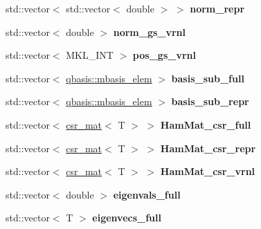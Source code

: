\begin{DoxyCompactItemize}
std\+::vector$<$ std\+::vector$<$ double $>$ $>$ {\bfseries norm\+\_\+repr}
\item 
\mbox{\label{classqbasis_1_1model_a9a034cbfdfd3a1cebce6a59deca95e88}} 
std\+::vector$<$ double $>$ {\bfseries norm\+\_\+gs\+\_\+vrnl}
\item 
\mbox{\label{classqbasis_1_1model_a86197f052b8c9aa50ea3d30afb9d124e}} 
std\+::vector$<$ M\+K\+L\+\_\+\+I\+NT $>$ {\bfseries pos\+\_\+gs\+\_\+vrnl}
\item 
\mbox{\label{classqbasis_1_1model_a5864161497fb7e506e3336f37271d5aa}} 
std\+::vector$<$ \hyperlink{classqbasis_1_1mbasis__elem}{qbasis\+::mbasis\+\_\+elem} $>$ {\bfseries basis\+\_\+sub\+\_\+full}
\item 
\mbox{\label{classqbasis_1_1model_a2593e9621f862522248a55952c84cd31}} 
std\+::vector$<$ \hyperlink{classqbasis_1_1mbasis__elem}{qbasis\+::mbasis\+\_\+elem} $>$ {\bfseries basis\+\_\+sub\+\_\+repr}
\item 
\mbox{\label{classqbasis_1_1model_af10f890c081c50a0ee5aa837745fc132}} 
std\+::vector$<$ \hyperlink{classqbasis_1_1csr__mat}{csr\+\_\+mat}$<$ T $>$ $>$ {\bfseries Ham\+Mat\+\_\+csr\+\_\+full}
\item 
\mbox{\label{classqbasis_1_1model_a42bdab787afa3fdf513dd769e515062c}} 
std\+::vector$<$ \hyperlink{classqbasis_1_1csr__mat}{csr\+\_\+mat}$<$ T $>$ $>$ {\bfseries Ham\+Mat\+\_\+csr\+\_\+repr}
\item 
\mbox{\label{classqbasis_1_1model_a89bd6858475c77dd41624dda751c4b80}} 
std\+::vector$<$ \hyperlink{classqbasis_1_1csr__mat}{csr\+\_\+mat}$<$ T $>$ $>$ {\bfseries Ham\+Mat\+\_\+csr\+\_\+vrnl}
\item 
\mbox{\label{classqbasis_1_1model_a2f50bec88bfd76fa11fb04e171116cb2}} 
std\+::vector$<$ double $>$ {\bfseries eigenvals\+\_\+full}
\item 
\mbox{\label{classqbasis_1_1model_a760ccd1a8b9158e16da5f0973ec8f8df}} 
std\+::vector$<$ T $>$ {\bfseries eigenvecs\+\_\+full}

\end{DoxyCompactItemize}
